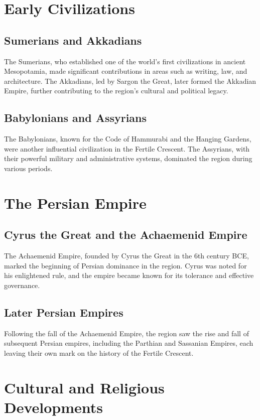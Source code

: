 \documentclass{book}
\begin{document}
\section{Early Civilizations}
\label{sec:early-civilizations}

\subsection{Sumerians and Akkadians}
The Sumerians, who established one of the world’s first civilizations in ancient Mesopotamia, made significant contributions in areas such as writing, law, and architecture. The Akkadians, led by Sargon the Great, later formed the Akkadian Empire, further contributing to the region's cultural and political legacy.

\subsection{Babylonians and Assyrians}
The Babylonians, known for the Code of Hammurabi and the Hanging Gardens, were another influential civilization in the Fertile Crescent. The Assyrians, with their powerful military and administrative systems, dominated the region during various periods.

\section{The Persian Empire}
\label{sec:persian-empire}

\subsection{Cyrus the Great and the Achaemenid Empire}
The Achaemenid Empire, founded by Cyrus the Great in the 6th century BCE, marked the beginning of Persian dominance in the region. Cyrus was noted for his enlightened rule, and the empire became known for its tolerance and effective governance.

\subsection{Later Persian Empires}
Following the fall of the Achaemenid Empire, the region saw the rise and fall of subsequent Persian empires, including the Parthian and Sassanian Empires, each leaving their own mark on the history of the Fertile Crescent.

\section{Cultural and Religious Developments}
\label{sec:cultural-religious-developments}
\end{document}

